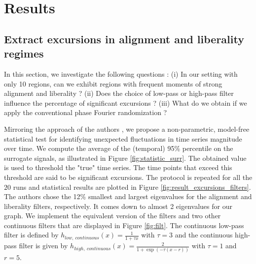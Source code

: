 \section{Results}

\subsection{Extract excursions in alignment and liberality regimes}
\label{excursion_results}

In this section, we investigate the following questions : (i) In our setting with only 10 regions, can we exhibit regions with frequent moments of strong alignment and liberality ? (ii) Does the choice of low-pass or high-pass filter influence the percentage of significant excursions ? (iii) What do we obtain if we apply the conventional phase Fourier randomization ?

Mirroring the approach of the authors \cite{huang_graph_2018}, we propose a non-parametric, model-free statistical test for identifying unexpected fluctuations in time series magnitude over time. 
We compute the average of the (temporal) 95\% percentile on the surrogate signals, as illustrated in Figure \ref{fig:statistic_surr}. The obtained value is used to threshold the "true" time series. The time points that exceed this threshold are said to be significant excursions.
The protocol is repeated for all the $20$ runs and statistical results are plotted in Figure \ref{fig:result_excursions_filters}. \\ 
The authors  chose the 12\% smallest and largest eigenvalues for the alignment and liberality filters, respectively. It comes down to almost 2 eigenvalues for our graph. 
We implement the equivalent version of the filters and two other continuous filters that are displayed in Figure \ref{fig:filt}. The continuous low-pass filter is defined by $h_{low,\ continuous}(x) = \frac{1}{1 + \tau x}$ with $\tau = 3$ and the continuous high-pass filter is given by $ h_{high,\ continuous}(x) = \frac{2}{1 + \exp(-\tau (x - r) ) }$ with $\tau = 1$ and $r = 5$.

